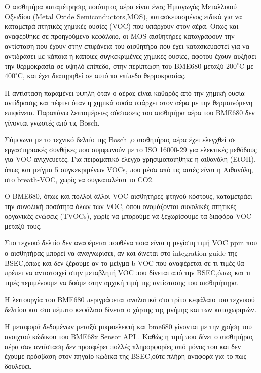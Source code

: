 Ο αισθητήρα καταμέτρησης ποιότητας αέρα είναι ένας Ημιαγωγός Μεταλλικού Οξειδίου (Metal Oxide Semiconductors,MOS),
κατασκευασμένος ειδικά για να καταμετρά πτητικές χημικές ουσίες (VOC) που υπάρχουν στον αέρα.
Όπως και αναφέρθηκε σε προηγούμενο κεφάλαιο, οι MOS αισθητήρες καταγράφουν την αντίσταση που έχουν στην επιφάνεια του αισθητήρα που έχει κατασκευαστεί για να αντιδράσει με κάποια 
ή κάποιες συγκεκριμένες χημικές ουσίες, αφότου έχουν αυξήσει την θερμοκρασία σε υψηλό επίπεδο, στην περίπτωση του BME680 μεταξύ $200^\circ \mathrm{C}$ με $400^\circ \mathrm{C}$,
και έχει διατηρηθεί σε αυτό το επίπεδο θερμοκρασίας.

Η αντίσταση παραμένει υψηλή όταν ο αέρας είναι καθαρός από την χημική ουσία αντίδρασης και πέφτει όταν η χημικά ουσία υπάρχει στον αέρα με την θερμαινόμενη επιφάνεια.
Παραπάνω λεπτομέρειες σύστασεις του αισθητήρα αέρα του BME680 δεν γίνονται γνωστές από τις Bosch.

Σύμφωνα με το τεχνικό δελτίο της Bosch \cite{BME680BOSCH},ο αισθητήρας αέρα έχει ελεγχθεί σε εργαστηριακές συνθήκες που συμφωνούν με το ISO 16000-29 για ελεκτικές μεθόδους για VOC ανιχνευετές.
Για πειραματικό έλεγχο χρησιμοποιήθηκε η αιθανόλη (EtOH),
όπως και μείγμα 5 συγκεκριμένων VOCs, που μέσα από τις αυτές είναι η Αιθανόλη, στο breath-VOC, χωρίς να συγκαταλέται το CO2.

Ο BME680, όπως και πολλοί άλλοι VOC αισθητήρες φτηνού κόστους, καταμετράει την συνολική ποσότητα όλων των VOC,
όπου ονομάζονται συνολικές πτητικές οργανικές ενώσεις (TVOCs), χωρίς να μπορούμε να  ξεχωρίσουμε τα διαφόρα VOC μεταξύ τους. 

Στο τεχνικό δελτίο δεν αναφέρεται πουθένα ποια είναι η μεγίστη τιμή VOC ppm που ο αισθητήρας μπορεί να αναγνωρίσει, αν και δίνεται στο integration guide της BSEC,όπως και δεν ξέρουμε αν το μείγμα b-VOC που 
αναφέρεται σε τι τιμές θα πρέπει να αντιστοιχεί στην μεταβλητή VOC που δίνεται από την BSEC,όπως και τι τιμές περιμένουμε να δούμε στην αρχική τιμή της
αντίστασης του αισθητήτηρα.


Η λειτουργία του BME680 περιγράφεται αναλυτικά στο τρίτο κεφάλαιο του τεχνικού δελτίου  \cite{BME680BOSCH} και στο πέμπτο κεφάλαιο δίνεται ο χάρτης της μνήμης και των καταχωρητώv. 

Η μεταφορά δεδομένων μεταξύ μικροελεκτή και bme680 γίνονται με την χρήση του ανοιχτού κώδικου του BME68x Sensor API \cite{BME68x}.
Καθώς η τιμή που δίνει ο αισθητήρας αέρα σαν αντίσταση δεν προσφέρει πολλές πληρορφορίες από μόνος του και δεν έχουμε πρόσβαση στον πηγαίο κώδικα της BSEC,ούτε πλήρη αναφορά για το πως δουλεύει.

